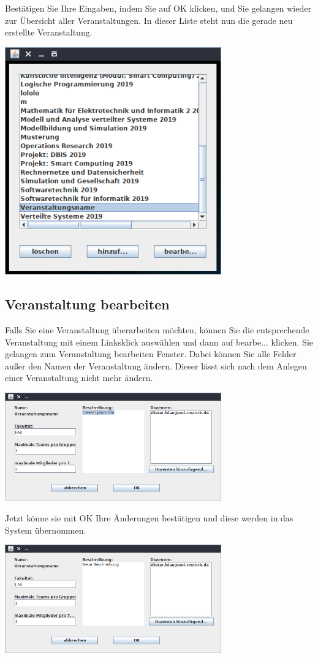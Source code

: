 \documentclass{Handbuch}
\begin{document}
Bestätigen Sie Ihre Eingaben, indem Sie auf \frqq OK\flqq{} klicken, und Sie gelangen wieder zur Übersicht aller Veranstaltungen. In dieser Liste steht nun die gerade neu erstellte Veranstaltung.
\begin{center}
	\includegraphics[width=0.7\textwidth]{img_adminGUI_08.png}
\end{center}

\subsection{Veranstaltung bearbeiten}
Falls Sie eine Veranstaltung überarbeiten möchten, können Sie die entsprechende Veranstaltung mit einem Linksklick auswählen und dann auf \frqq bearbe...\flqq{} klicken. Sie gelangen zum \glqq Veranstaltung bearbeiten\grqq{} Fenster. Dabei können Sie alle Felder außer den Namen der Veranstaltung ändern. Dieser lässt sich nach dem Anlegen einer Veranstaltung nicht mehr ändern.
\begin{center}
	\includegraphics[width=0.7\textwidth]{img_adminGUI_09.png}
\end{center}
Jetzt könne sie mit \frqq OK\flqq{} Ihre Änderungen bestätigen und diese werden in das System übernommen.
\begin{center}
	\includegraphics[width=0.7\textwidth]{img_adminGUI_10.png}
\end{center}
\end{document}
